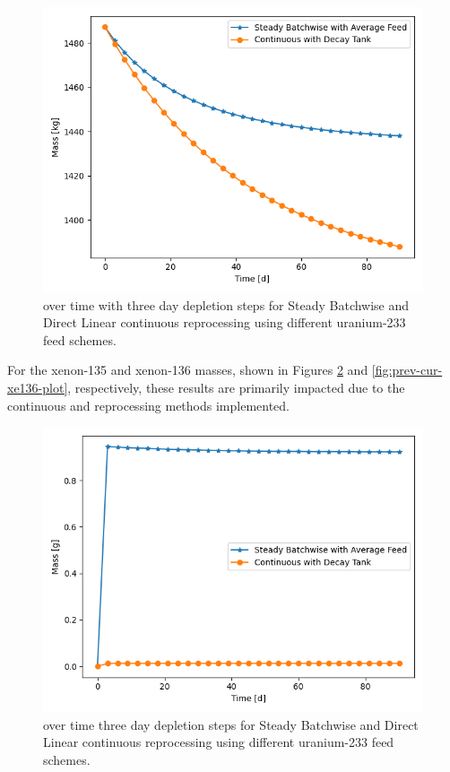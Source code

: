 \begin{figure}[H]
  \centering
  \includegraphics[scale=0.7]{images/prev-cur-u233.png}
  \caption{ over time with three day depletion steps for Steady Batchwise and Direct Linear continuous reprocessing using different uranium-233 feed schemes.}
   \label{fig:prev-cur-u233-plot}
\end{figure}

For the xenon-135 and xenon-136 masses, shown in Figures \ref{fig:prev-cur-xe135-plot} and \ref{fig:prev-cur-xe136-plot}, respectively, these results are primarily impacted due to the continuous and reprocessing methods implemented.

\begin{figure}[H]
  \centering
  \includegraphics[scale=0.7]{images/prev-cur-xe135.png}
  \caption{ over time three day depletion steps for Steady Batchwise and Direct Linear continuous reprocessing using different uranium-233 feed schemes.}
   \label{fig:prev-cur-xe135-plot}
\end{figure}


